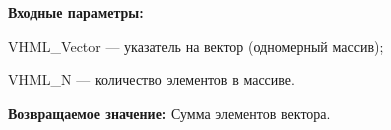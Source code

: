 \textbf{Входные параметры:}

 VHML\_Vector --- указатель на вектор (одномерный массив);
 
 VHML\_N --- количество элементов в массиве.

\textbf{Возвращаемое значение:}
Сумма элементов вектора.